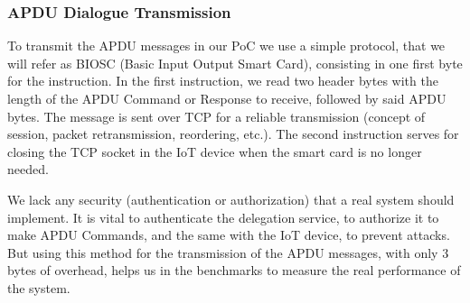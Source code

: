 \documentclass[journal]{IEEEtran}
\begin{document}
\hfil


%
%




\subsubsection{APDU Dialogue Transmission}


To transmit the APDU messages in our PoC we use a simple protocol, that we will refer as BIOSC (Basic Input Output Smart Card), consisting in one first byte for the instruction.
In the first instruction, we read two header bytes with the length of the APDU Command or Response to receive, followed by said APDU bytes. The message is sent over TCP for a reliable transmission (concept of session, packet retransmission, reordering, etc.). The second instruction serves for closing the TCP socket in the IoT device when the smart card is no longer needed.

We lack any security (authentication or authorization) that a real system should implement. It is vital to authenticate the delegation service, to authorize it to make APDU Commands, and the same with the IoT device, to prevent attacks. But using this method for the transmission of the APDU messages, with only 3 bytes of overhead, helps us in the  benchmarks to measure the real performance of the system.
\end{document}
